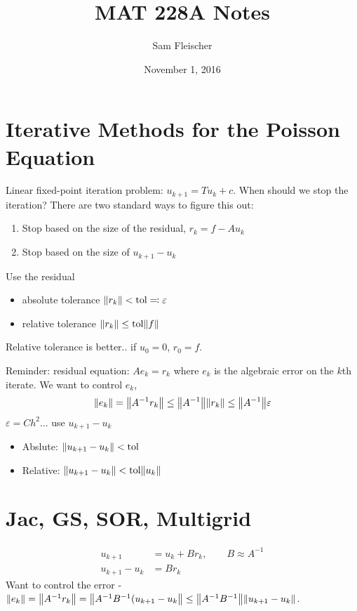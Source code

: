 \documentclass{article}
\title{MAT 228A Notes}
\author{Sam Fleischer}
\date{November 1, 2016}
\newcommand{\E}{\varepsilon}
\begin{document}
    \maketitle

    \section{Iterative Methods for the Poisson Equation}
        Linear fixed-point iteration problem: $u_{k+1} = Tu_k + c$.  When should we stop the iteration?  There are two standard ways to figure this out:
        \begin{enumerate}
            \item Stop based on the size of the residual, $r_k = f - Au_k$
            \item Stop based on the size of $u_{k+1} - u_k$
        \end{enumerate}
        Use the residual
        \begin{itemize}
            \item absolute tolerance $\norm{r_k} < \text{tol} \eqqcolon \E$
            \item relative tolerance $\norm{r_k} \leq \text{tol}\norm{f}$
        \end{itemize}
        Relative tolerance is better.. if $u_0 = 0$, $r_0 = f$.

        Reminder: residual equation: $Ae_k = r_k$ where $e_k$ is the algebraic error on the $k$th iterate.  We want to control $e_k$,
        \begin{align*}
            \norm{e_k} = \norm{A^{-1}r_k} \leq \norm{A^{-1}}\norm{r_k} \leq \norm{A^{-1}}\E
        \end{align*}
        $\E = Ch^2$... use $u_{k+1} - u_k$
        \begin{itemize}
            \item Abslute: $\norm{u_{k+1} - u_k} < \text{tol}$
            \item Relative: $\norm{u_{k+1} - u_k} < \text{tol}\norm{u_k}$
        \end{itemize}

    \section{Jac, GS, SOR, Multigrid}
        \begin{align*}
            u_{k+1} &= u_k + Br_k, \qquad B \approx A^{-1} \\
            u_{k+1} - u_k &= Br_k
        \end{align*}
        Want to control the error - $\norm{e_k} = \norm{A^{-1}r_k} = \norm{A^{-1}B^{-1}(u_{k+1} - u_k} \leq \norm{A^{-1}B^{-1}}\norm{u_{k+1} - u_k}$.
\end{document}
